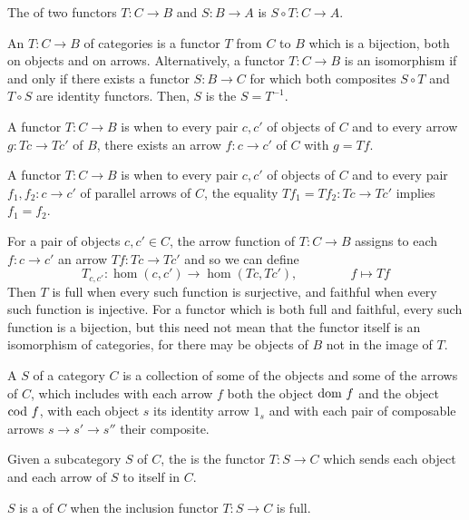 \documentclass[11pt,letterpaper]{jacky}
\begin{document}
\begin{defi}
    The  of two functors $T:C\rightarrow B$ and
    $S:B\rightarrow A$ is $S\circ T:C\rightarrow A$.
\end{defi}

\begin{defi}
    An  $T:C\rightarrow B$ of categories is a functor $T$
    from $C$ to $B$ which is a bijection, both on objects and on arrows.
    Alternatively, a functor $T:C\rightarrow B$ is an isomorphism if and only
    if there exists a functor $S:B\rightarrow C$ for which both composites
    $S\circ T$ and $T\circ S$ are identity functors. Then, $S$ is the
     $S=T^{-1}$.
\end{defi}

\begin{defi}
    A functor $T:C\rightarrow B$ is  when to every pair $c, c'$ of
    objects of $C$ and to every arrow $g:Tc\rightarrow Tc'$ of $B$, there
    exists an arrow $f:c\rightarrow c'$ of $C$ with $g=Tf$.
\end{defi}

\begin{defi}
    A functor $T:C\rightarrow B$ is  when to every pair $c,
    c'$ of objects of $C$ and to every pair $f_1,f_2:c\rightarrow c'$ of
    parallel arrows of $C$, the equality $Tf_1=Tf_2:Tc\rightarrow Tc'$ implies
    $f_1=f_2$.
\end{defi}

For a pair of objects $c,c'\in C$, the arrow function of $T:C\rightarrow B$
assigns to each $f:c\rightarrow c'$ an arrow $Tf:Tc\rightarrow Tc'$ and so we
can define
\[T_{c,c'}:\hom(c,c')\rightarrow\hom(Tc,Tc'),\hspace{50pt}f\mapsto Tf\]
Then $T$ is full when every such function is surjective, and faithful when
every such function is injective. For a functor which is both full and
faithful, every such function is a bijection, but this need not mean that the
functor itself is an isomorphism of categories, for there may be objects of $B$
not in the image of $T$.

\begin{defi}
    A  $S$ of a category $C$ is a collection of some of the
    objects and some of the arrows of $C$, which includes with each arrow $f$
    both the object $\dom[f]$ and the object $\cod[f]$, with each object $s$
    its identity arrow $1_s$ and with each pair of composable arrows
    $s\rightarrow s'\rightarrow s''$ their composite.
\end{defi}

\begin{defi}
    Given a subcategory $S$ of $C$, the  is the
    functor $T:S\rightarrow C$ which sends each object and each arrow of $S$ to
    itself in $C$.
\end{defi}

\begin{defi}
    $S$ is a  of $C$ when the inclusion functor
    $T:S\rightarrow C$ is full.
\end{defi}
\end{document}
